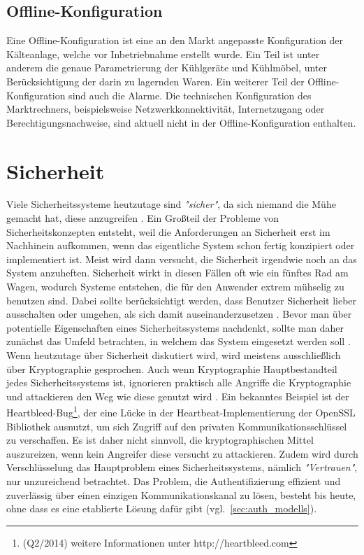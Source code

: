 \documentclass[11pt,a4paper]{report}
\begin{document}
\subsection{Offline-Konfiguration} 

Eine Offline-Konfiguration ist eine an den Markt angepasste Konfiguration der Kälteanlage, welche vor Inbetriebnahme erstellt wurde. Ein Teil ist unter anderem die genaue Parametrierung der Kühlgeräte und Kühlmöbel, unter Berücksichtigung der darin zu lagernden Waren. Ein weiterer Teil der Offline-Konfiguration sind auch die Alarme. Die technischen Konfiguration des Marktrechners, beispielsweise Netzwerkkonnektivität, Internetzugang oder Berechtigungsnachweise, sind aktuell nicht in der Offline-Konfiguration enthalten.

\section{Sicherheit} \label{sec:security_conzept}

Viele Sicherheitssysteme heutzutage sind \textit{"sicher"}, da sich niemand die Mühe gemacht hat, diese anzugreifen \cite[s.~0]{gutmann}. Ein Großteil der Probleme von Sicherheitskonzepten entsteht, weil die Anforderungen an Sicherheit erst im Nachhinein aufkommen, wenn das eigentliche System schon fertig konzipiert oder implementiert ist. Meist wird dann versucht, die Sicherheit irgendwie noch an das System anzuheften. Sicherheit wirkt in diesen Fällen oft wie ein fünftes Rad am Wagen, wodurch Systeme entstehen, die für den Anwender extrem mühselig zu benutzen sind. Dabei sollte berücksichtigt werden, dass Benutzer Sicherheit lieber ausschalten oder umgehen, als sich damit auseinanderzusetzen \cite[s.~5]{gutmann}. Bevor man über potentielle Eigenschaften eines Sicherheitssystems nachdenkt, sollte man daher zunächst das Umfeld betrachten, in welchem das System eingesetzt werden soll \cite[s.~4]{gutmann}. Wenn heutzutage über Sicherheit diskutiert wird, wird meistens ausschließlich über Kryptographie gesprochen. Auch wenn Kryptographie Hauptbestandteil jedes Sicherheitssystems ist, ignorieren praktisch alle Angriffe die Kryptographie und attackieren den Weg wie diese genutzt wird \cite[s.~1]{gutmann}. Ein bekanntes Beispiel ist der Heartbleed-Bug\footnote{(Q2/2014) weitere Informationen unter http://heartbleed.com}, der eine Lücke in der Heartbeat-Implementierung der OpenSSL Bibliothek ausnutzt, um sich Zugriff auf den privaten Kommunikationsschlüssel zu verschaffen. Es ist daher nicht sinnvoll, die kryptographischen Mittel auszureizen, wenn kein Angreifer diese versucht zu attackieren. Zudem wird durch Verschlüsselung das Hauptproblem eines Sicherheitssystems, nämlich \textit{"Vertrauen"}, nur unzureichend betrachtet. Das Problem, die Authentifizierung effizient und zuverlässig über einen einzigen Kommunikationskanal zu lösen, besteht bis heute, ohne dass es eine etablierte Lösung dafür gibt (vgl.~\ref{sec:auth_modells}). 
\end{document}
